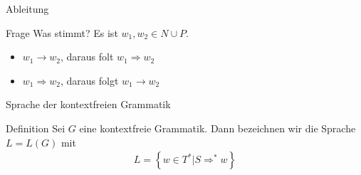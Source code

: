 \begin{frame}{Ableitung}
    \begin{block}{Frage}
        Was stimmt? Es ist $w_1, w_2 \in N \cup P$.
        \begin{itemize}
            \item $w_1 \rightarrow w_2$, daraus folt $w_1 \Rightarrow w_2$
            \item $w_1 \Rightarrow w_2$, daraus folgt $w_1 \rightarrow w_2$
        \end{itemize}
    \end{block}
\end{frame}

\begin{frame}{Sprache der kontextfreien Grammatik}
    \begin{block}{Definition}
        Sei $G$ eine kontextfreie Grammatik. Dann bezeichnen wir die Sprache $L = L\left(G\right)$ mit 
        \begin{align*}
            L = \left\{ w\in T^* \big| S \Rightarrow^* w\right\}
        \end{align*}
    \end{block}
    \pause
\end{frame}

